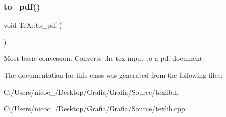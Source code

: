 \subsubsection{\texorpdfstring{to\+\_\+pdf()}{to\_pdf()}}
{\footnotesize\ttfamily void Te\+X\+::to\+\_\+pdf (\begin{DoxyParamCaption}{ }\end{DoxyParamCaption})}

Most basic conversion. Converts the tex input to a pdf document 

The documentation for this class was generated from the following files\+:\begin{DoxyCompactItemize}
\item 
C\+:/\+Users/nicoc\+\_/\+Desktop/\+Grafia/\+Grafia/\+Source/texlib.\+h\item 
C\+:/\+Users/nicoc\+\_/\+Desktop/\+Grafia/\+Grafia/\+Source/texlib.\+cpp\end{DoxyCompactItemize}
